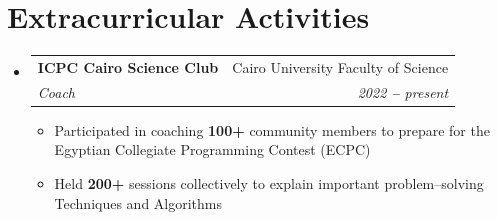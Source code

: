 \documentclass[a4paper,12pt]{article}
\makeatletter
\newcommand{\resumeItem}[1]{
  \item\small{
    {#1 \vspace{-2pt}}
  }
}
\newcommand{\resumeSubheading}[4]{
  \vspace{-2pt}\item
    \begin{tabular*}{0.97\textwidth}[t]{l@{\extracolsep{\fill}}r}
      \textbf{#1} & #2 \\
      \textit{\small#3} & \textit{\small #4} \\
    \end{tabular*}\vspace{-7pt}
}
\newcommand{\resumeSubHeadingListStart}{\begin{itemize}[leftmargin=0.15in, label={}]}
\newcommand{\resumeSubHeadingListEnd}{\end{itemize}}
\newcommand{\resumeItemListStart}{\begin{itemize}}
\newcommand{\resumeItemListEnd}{\end{itemize}\vspace{-5pt}}
\makeatother
\begin{document}
\section{Extracurricular Activities}

\resumeSubHeadingListStart

\resumeSubheading{ICPC Cairo Science Club \href{https://www.facebook.com/sci.cpc}{\faLink}}{Cairo University Faculty of Science}
{Coach} {2022 \textbf{--} present}
\resumeItemListStart
\resumeItem{Participated in coaching \textbf{100+} community members to prepare for the Egyptian Collegiate Programming Contest (ECPC)}
\resumeItem{Held \textbf{200+} sessions collectively to explain important problem–solving Techniques and Algorithms}
\resumeItemListEnd

\resumeSubHeadingListEnd
\end{document}
